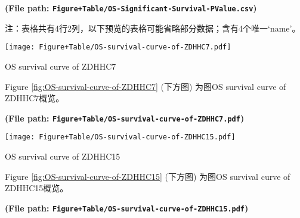 \documentclass[
]{article}
\begin{document}
\textbf{(File path: \texttt{Figure+Table/OS-Significant-Survival-PValue.csv})}

\begin{center}\begin{tcolorbox}[colback=gray!10, colframe=gray!50, width=0.9\linewidth, arc=1mm, boxrule=0.5pt]注：表格共有4行2列，以下预览的表格可能省略部分数据；含有4个唯一`name'。
\end{tcolorbox}
\end{center}

\begin{center}\vspace{1.5cm}\end{center}

\begin{center}\vspace{1.5cm}\end{center}
\def\@captype{figure}
\begin{center}
\texttt{[image: Figure+Table/OS-survival-curve-of-ZDHHC7.pdf]}
\caption{OS survival curve of ZDHHC7}\label{fig:OS-survival-curve-of-ZDHHC7}
\end{center}

Figure \ref{fig:OS-survival-curve-of-ZDHHC7} (下方图) 为图OS survival curve of ZDHHC7概览。

\textbf{(File path: \texttt{Figure+Table/OS-survival-curve-of-ZDHHC7.pdf})}

\begin{center}\vspace{1.5cm}\end{center}

\begin{center}\vspace{1.5cm}\end{center}
\def\@captype{figure}
\begin{center}
\texttt{[image: Figure+Table/OS-survival-curve-of-ZDHHC15.pdf]}
\caption{OS survival curve of ZDHHC15}\label{fig:OS-survival-curve-of-ZDHHC15}
\end{center}

Figure \ref{fig:OS-survival-curve-of-ZDHHC15} (下方图) 为图OS survival curve of ZDHHC15概览。

\textbf{(File path: \texttt{Figure+Table/OS-survival-curve-of-ZDHHC15.pdf})}
\end{document}
